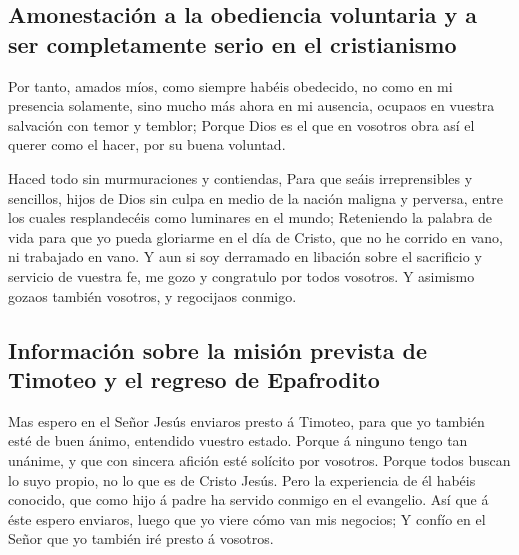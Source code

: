 \hypertarget{amonestaciuxf3n-a-la-obediencia-voluntaria-y-a-ser-completamente-serio-en-el-cristianismo}{%
\subsection{Amonestación a la obediencia voluntaria y a ser
completamente serio en el
cristianismo}\label{amonestaciuxf3n-a-la-obediencia-voluntaria-y-a-ser-completamente-serio-en-el-cristianismo}}

 Por tanto, amados míos, como siempre habéis obedecido,
no como en mi presencia solamente, sino mucho más ahora en mi ausencia,
ocupaos en vuestra salvación con temor y temblor;  Porque
Dios es el que en vosotros obra así el querer como el hacer, por su
buena voluntad.

 Haced todo sin murmuraciones y contiendas,
 Para que seáis irreprensibles y sencillos, hijos de Dios
sin culpa en medio de la nación maligna y perversa, entre los cuales
resplandecéis como luminares en el mundo;  Reteniendo la
palabra de vida para que yo pueda gloriarme en el día de Cristo, que no
he corrido en vano, ni trabajado en vano.  Y aun si soy
derramado en libación sobre el sacrificio y servicio de vuestra fe, me
gozo y congratulo por todos vosotros.  Y asimismo gozaos
también vosotros, y regocijaos conmigo.

\hypertarget{informaciuxf3n-sobre-la-misiuxf3n-prevista-de-timoteo-y-el-regreso-de-epafrodito}{%
\subsection{Información sobre la misión prevista de Timoteo y el regreso
de
Epafrodito}\label{informaciuxf3n-sobre-la-misiuxf3n-prevista-de-timoteo-y-el-regreso-de-epafrodito}}

 Mas espero en el Señor Jesús enviaros presto á Timoteo,
para que yo también esté de buen ánimo, entendido vuestro estado.
 Porque á ninguno tengo tan unánime, y que con sincera
afición esté solícito por vosotros.  Porque todos buscan
lo suyo propio, no lo que es de Cristo Jesús.  Pero la
experiencia de él habéis conocido, que como hijo á padre ha servido
conmigo en el evangelio.  Así que á éste espero enviaros,
luego que yo viere cómo van mis negocios;  Y confío en el
Señor que yo también iré presto á vosotros.

